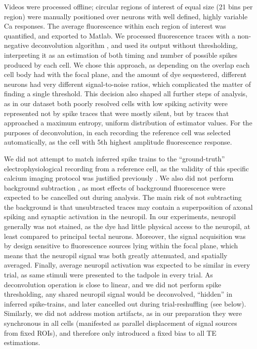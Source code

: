 \documentclass{article}
\begin{document}
Videos were processed offline; circular regions of interest of equal size (21 bins per region) were manually positioned over neurons with well defined, highly variable Ca responses. The average fluorescence within each region of interest was quantified, and exported to Matlab. We processed fluorescence traces with a non-negative deconvolution algorithm \citep{vogelstein2010oopsi}, and used its output without thresholding, interpreting it as an estimation of both timing and number of possible spikes produced by each cell. We chose this approach, as depending on the overlap each cell body had with the focal plane, and the amount of dye sequestered, different neurons had very different signal-to-noise ratios, which complicated the matter of finding a single threshold. This decision also shaped all further steps of analysis, as in our dataset both poorly resolved cells with low spiking activity were represented not by spike traces that were mostly silent, but by traces that approached a maximum entropy, uniform distribution of estimator values. For the purposes of deconvolution, in each recording the reference cell was selected automatically, as the cell with 5th highest amplitude fluorescence response.

We did not attempt to match inferred spike trains to the “ground-truth” electrophysiological recording from a reference cell, as the validity of this specific calcium imaging protocol was justified previously \citep{xu2011,truszkowski2017}. We also did not perform background subtraction \citep{truszkowski2017}, as most effects of background fluorescence were expected to be cancelled out during analysis. The main risk of not subtracting the background is that unsubtracted traces may contain a superposition of axonal spiking and synaptic activation in the neuropil. In our experiments, neuropil generally was not stained, as the dye had little physical access to the neuropil, at least compared to principal tectal neurons. Moreover, the signal acquisition was by design sensitive to fluorescence sources lying within the focal plane, which means that the neuropil signal was both greatly attenuated, and spatially averaged. Finally, average neuropil activation was expected to be similar in every trial, as same stimuli were presented to the tadpole in every trial. As deconvolution operation is close to linear, and we did not perform spike thresholding, any shared neuropil signal would be deconvolved, “hidden” in inferred spike-trains, and later cancelled out during trial-reshuffling (see below). Similarly, we did not address motion artifacts, as in our preparation they were synchronous in all cells (manifested as parallel displacement of signal sources from fixed ROIs), and therefore only introduced a fixed bias to all TE estimations.
\end{document}
